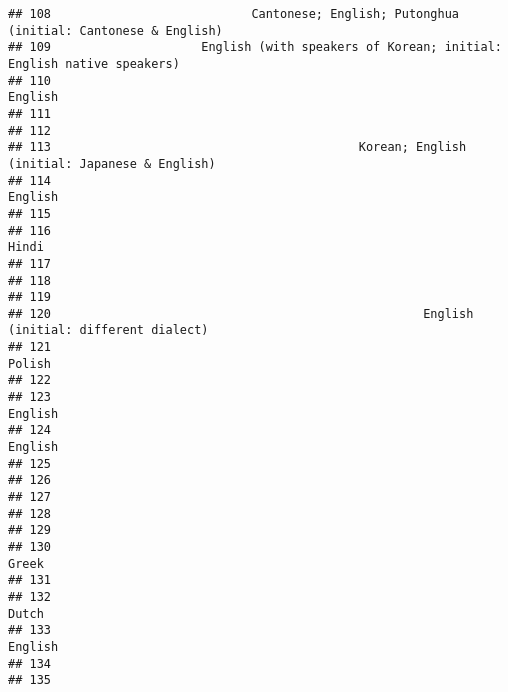 \documentclass[
  english,
  man]{apa6}
\begin{document}
\begin{verbatim}
## 108                            Cantonese; English; Putonghua (initial: Cantonese & English)
## 109                     English (with speakers of Korean; initial: English native speakers)
## 110                                                                                 English
## 111                                                                                        
## 112                                                                                        
## 113                                           Korean; English (initial: Japanese & English)
## 114                                                                                 English
## 115                                                                                        
## 116                                                                                   Hindi
## 117                                                                                        
## 118                                                                                        
## 119                                                                                        
## 120                                                    English (initial: different dialect)
## 121                                                                                  Polish
## 122                                                                                        
## 123                                                                                 English
## 124                                                                                 English
## 125                                                                                        
## 126                                                                                        
## 127                                                                                        
## 128                                                                                        
## 129                                                                                        
## 130                                                                                   Greek
## 131                                                                                        
## 132                                                                                   Dutch
## 133                                                                                 English
## 134                                                                                        
## 135                                                                                        

\end{verbatim}
\end{document}
